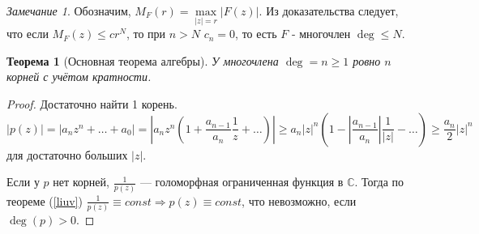 \documentclass[12pt]{article}
\renewcommand{\C}{\mathbb{C}}
\newcommand{\Ra}{\Rightarrow}
\newcounter{cnt}
\theoremstyle{thmnote}
\newtheorem{theorem}[cnt]{Теорема}
\theoremstyle{remark}
\newtheorem*{remark}{Замечание}
\theoremstyle{defnote}
\begin{document}
\begin{remark}
    Обозначим, $M_F(r) = \underset{|z| = r}{\max} |F(z)|$. Из доказательства следует, что если $M_F(z) \leq c r^N$, то при $n > N$ $c_n = 0$, то есть $F$ - многочлен $\deg \leq N$.
\end{remark}

\begin{theorem}[Основная теорема алгебры]
    У многочлена $\deg = n \geq 1$ ровно $n$ корней с учётом кратности.
\end{theorem}
\begin{proof}
    Достаточно найти 1 корень.
    \begin{equation*}
        |p(z)| = |a_n z^n + \dots + a_0| = \left|a_n z^n \left(1 + \frac{a_{n-1}}{a_n} \frac{1}{z} + \dots \right)\right| \geq a_n |z|^n \left(1 - \left|\frac{a_{n-1}}{a_n}\right| \frac{1}{|z|} - \dots\right) \geq \frac{a_n}{2} |z|^n
    \end{equation*}
    для достаточно больших $|z|$.

    Если у $p$ нет корней, $\frac{1}{p(z)}$ --- голоморфная ограниченная функция в $\C$. Тогда по теореме (\ref{liuv}) $\frac{1}{p(z)} \equiv const \Ra p(z) \equiv const$, что невозможно, если $\deg(p) > 0$.
\end{proof}
\end{document}
